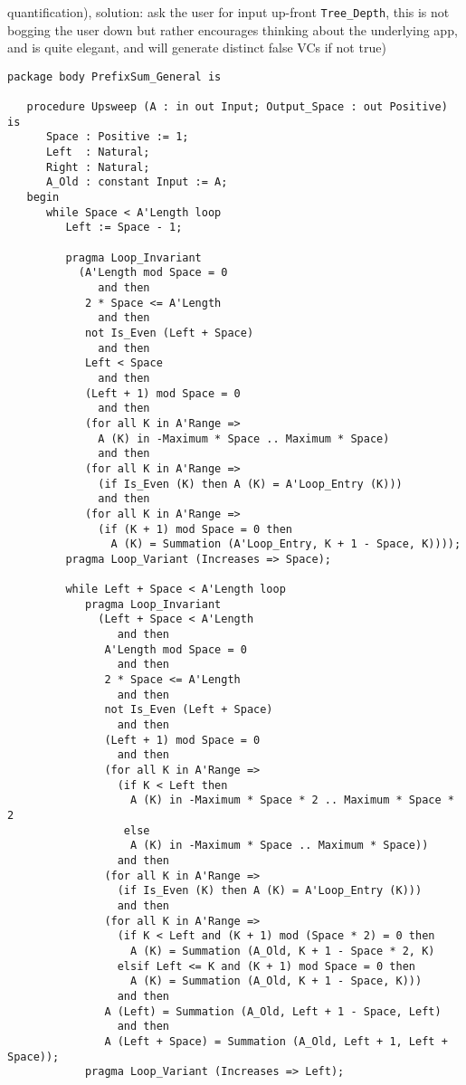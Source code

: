 \documentclass[sttt,draft]{svjour}
\begin{document}
quantification), solution: ask the user for input up-front
\verb|Tree_Depth|, this is not bogging the user down but rather
encourages thinking about the underlying app, and is quite elegant,
and will generate distinct false VCs if not true)
%
\begin{footnotesize}
\begin{verbatim}
package body PrefixSum_General is

   procedure Upsweep (A : in out Input; Output_Space : out Positive) is
      Space : Positive := 1;
      Left  : Natural;
      Right : Natural;
      A_Old : constant Input := A;
   begin
      while Space < A'Length loop
         Left := Space - 1;

         pragma Loop_Invariant
           (A'Length mod Space = 0
              and then
            2 * Space <= A'Length
              and then
            not Is_Even (Left + Space)
              and then
            Left < Space
              and then
            (Left + 1) mod Space = 0
              and then
            (for all K in A'Range =>
              A (K) in -Maximum * Space .. Maximum * Space)
              and then
            (for all K in A'Range =>
              (if Is_Even (K) then A (K) = A'Loop_Entry (K)))
              and then
            (for all K in A'Range =>
              (if (K + 1) mod Space = 0 then
                A (K) = Summation (A'Loop_Entry, K + 1 - Space, K))));
         pragma Loop_Variant (Increases => Space);

         while Left + Space < A'Length loop
            pragma Loop_Invariant
              (Left + Space < A'Length
                 and then
               A'Length mod Space = 0
                 and then
               2 * Space <= A'Length
                 and then
               not Is_Even (Left + Space)
                 and then
               (Left + 1) mod Space = 0
                 and then
               (for all K in A'Range =>
                 (if K < Left then
                   A (K) in -Maximum * Space * 2 .. Maximum * Space * 2
                  else
                   A (K) in -Maximum * Space .. Maximum * Space))
                 and then
               (for all K in A'Range =>
                 (if Is_Even (K) then A (K) = A'Loop_Entry (K)))
                 and then
               (for all K in A'Range =>
                 (if K < Left and (K + 1) mod (Space * 2) = 0 then
                   A (K) = Summation (A_Old, K + 1 - Space * 2, K)
                 elsif Left <= K and (K + 1) mod Space = 0 then
                   A (K) = Summation (A_Old, K + 1 - Space, K)))
                 and then
               A (Left) = Summation (A_Old, Left + 1 - Space, Left)
                 and then
               A (Left + Space) = Summation (A_Old, Left + 1, Left + Space));
            pragma Loop_Variant (Increases => Left);


\end{verbatim}
\end{footnotesize}
\end{document}
